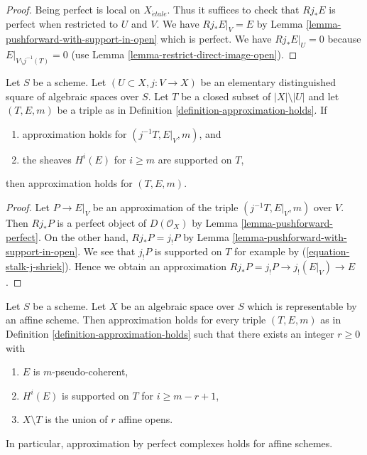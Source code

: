 \begin{proof}
Being perfect is local on $X_{\acute{e}tale}$. Thus it suffices to
check that $Rj_*E$ is perfect when restricted to $U$ and $V$.
We have $Rj_*E|_V = E$ by Lemma \ref{lemma-pushforward-with-support-in-open}
which is perfect. We have $Rj_*E|_U = 0$ because
$E|_{V \setminus j^{-1}(T)} = 0$ (use
Lemma \ref{lemma-restrict-direct-image-open}).
\end{proof}

\begin{lemma}
\label{lemma-open}
Let $S$ be a scheme. Let $(U \subset X, j : V \to X)$ be an elementary
distinguished square of algebraic spaces over $S$. Let $T$ be a closed
subset of $|X| \setminus |U|$ and let $(T, E, m)$ be a triple as in
Definition \ref{definition-approximation-holds}. If
\begin{enumerate}
\item approximation holds for $(j^{-1}T, E|_V, m)$, and
\item the sheaves $H^i(E)$ for $i \geq m$ are supported on $T$,
\end{enumerate}
then approximation holds for $(T, E, m)$.
\end{lemma}

\begin{proof}
Let $P \to E|_V$ be an approximation of the triple $(j^{-1}T, E|_V, m)$
over $V$. Then $Rj_*P$ is a perfect object of $D(\mathcal{O}_X)$ by
Lemma \ref{lemma-pushforward-perfect}. On the other hand,
$Rj_*P = j_!P$ by Lemma \ref{lemma-pushforward-with-support-in-open}.
We see that $j_!P$ is supported on $T$ for example by
(\ref{equation-stalk-j-shriek}).
Hence we obtain an approximation $Rj_*P = j_!P \to j_!(E|_V) \to E$.
\end{proof}

\begin{lemma}
\label{lemma-approximation-affine}
Let $S$ be a scheme. Let $X$ be an algebraic space over $S$ which is
representable by an affine scheme. Then approximation holds for every
triple $(T, E, m)$ as in Definition \ref{definition-approximation-holds}
such that there exists an integer $r \geq 0$ with
\begin{enumerate}
\item $E$ is $m$-pseudo-coherent,
\item $H^i(E)$ is supported on $T$ for $i \geq m - r + 1$,
\item $X \setminus T$ is the union of $r$ affine opens.
\end{enumerate}
In particular, approximation by perfect complexes holds for affine schemes.
\end{lemma}

